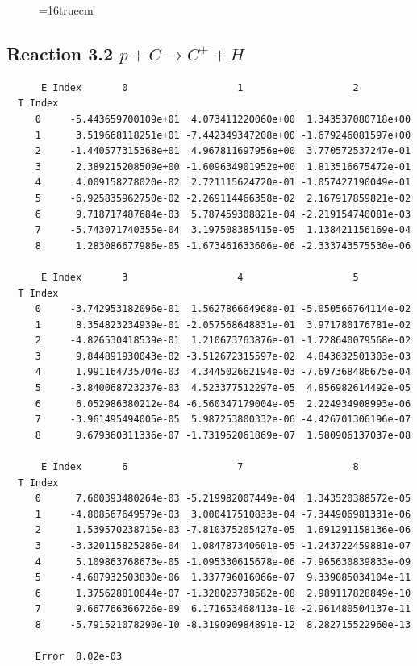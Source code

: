 \documentclass[12pt,dvipdfmx]{article}
\begin{document}
\begin{figure} \label{met.3_3.1.4}
\epsfxsize=16truecm
\end{figure}
\newpage


\subsection{
Reaction 3.2      $p + C \rightarrow C^+ + H $
}


\begin{small}\begin{verbatim}
      E Index       0                   1                   2
  T Index
     0     -5.443659700109e+01  4.073411220060e+00  1.343537080718e+00
     1      3.519668118251e+01 -7.442349347208e+00 -1.679246081597e+00
     2     -1.440577315368e+01  4.967811697956e+00  3.770572537247e-01
     3      2.389215208509e+00 -1.609634901952e+00  1.813516675472e-01
     4      4.009158278020e-02  2.721115624720e-01 -1.057427190049e-01
     5     -6.925835962750e-02 -2.269114466358e-02  2.167917859821e-02
     6      9.718717487684e-03  5.787459308821e-04 -2.219154740081e-03
     7     -5.743071740355e-04  3.197508385415e-05  1.138421156169e-04
     8      1.283086677986e-05 -1.673461633606e-06 -2.333743575530e-06

      E Index       3                   4                   5
  T Index
     0     -3.742953182096e-01  1.562786664968e-01 -5.050566764114e-02
     1      8.354823234939e-01 -2.057568648831e-01  3.971780176781e-02
     2     -4.826530418539e-01  1.210673763876e-01 -1.728640079568e-02
     3      9.844891930043e-02 -3.512672315597e-02  4.843632501303e-03
     4      1.991164735704e-03  4.344502662194e-03 -7.697368486675e-04
     5     -3.840068723237e-03  4.523377512297e-05  4.856982614492e-05
     6      6.052986380212e-04 -6.560347179004e-05  2.224934908993e-06
     7     -3.961495494005e-05  5.987253800332e-06 -4.426701306196e-07
     8      9.679360311336e-07 -1.731952061869e-07  1.580906137037e-08

      E Index       6                   7                   8
  T Index
     0      7.600393480264e-03 -5.219982007449e-04  1.343520388572e-05
     1     -4.808567649579e-03  3.000417510833e-04 -7.344906981331e-06
     2      1.539570238715e-03 -7.810375205427e-05  1.691291158136e-06
     3     -3.320115825286e-04  1.084787340601e-05 -1.243722459881e-07
     4      5.109863768673e-05 -1.095330615678e-06 -7.965630839833e-09
     5     -4.687932503830e-06  1.337796016066e-07  9.339085034104e-11
     6      1.375628810844e-07 -1.328023738582e-08  2.989117828849e-10
     7      9.667766366726e-09  6.171653468413e-10 -2.961480504137e-11
     8     -5.791521078290e-10 -8.319090984891e-12  8.282715522960e-13

     Error  8.02e-03
\end{verbatim}\end{small}
\end{document}
